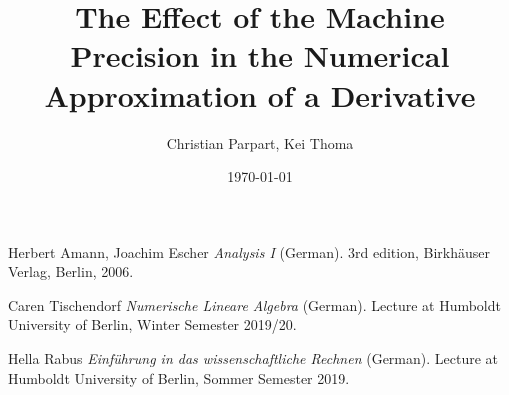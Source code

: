 \documentclass[a4paper,12pt]{scrartcl}
\title{The Effect of the Machine Precision in the Numerical Approximation of a Derivative}
\author{Christian Parpart, Kei Thoma}
\date{\today}
\begin{document}
\maketitle
\tableofcontents









\begin{thebibliography}{2}

Herbert Amann, Joachim Escher
\textit{Analysis I} (German). 
3rd edition, Birkh{\"a}user Verlag, Berlin, 2006.

Caren Tischendorf
\textit{Numerische Lineare Algebra} (German).
Lecture at Humboldt University of Berlin, Winter Semester 2019/20.

Hella Rabus
\textit{Einf{\"u}hrung in das wissenschaftliche Rechnen} (German).
Lecture at Humboldt University of Berlin, Sommer Semester 2019.

\end{thebibliography}
\end{document}
